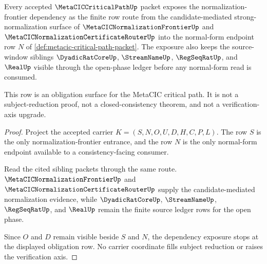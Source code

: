 \begin{theorem}
\label{thm:metacic-critical-path-normalization-frontier-dependency-exposure}
Every accepted $\MetaCICCriticalPathUp$ packet exposes the normalization-frontier dependency as the finite row route from the candidate-mediated strong-normalization surface of $\MetaCICNormalizationFrontierUp$ and $\MetaCICNormalizationCertificateRouterUp$ into the normal-form endpoint row $N$ of \autoref{def:metacic-critical-path-packet}. The exposure also keeps the source-window siblings $\DyadicRatCoreUp$, $\StreamNameUp$, $\RegSeqRatUp$, and $\RealUp$ visible through the open-phase ledger before any normal-form read is consumed.

This row is an obligation surface for the MetaCIC critical path. It is not a subject-reduction proof, not a closed-consistency theorem, and not a verification-axis upgrade.
\end{theorem}
\begin{proof}
Project the accepted carrier $K=(S,N,O,U,D,H,C,P,L)$. The row $S$ is the only normalization-frontier entrance, and the row $N$ is the only normal-form endpoint available to a consistency-facing consumer.

Read the cited sibling packets through the same route. $\MetaCICNormalizationFrontierUp$ and $\MetaCICNormalizationCertificateRouterUp$ supply the candidate-mediated normalization evidence, while $\DyadicRatCoreUp$, $\StreamNameUp$, $\RegSeqRatUp$, and $\RealUp$ remain the finite source ledger rows for the open phase.

Since $O$ and $D$ remain visible beside $S$ and $N$, the dependency exposure stops at the displayed obligation row. No carrier coordinate fills subject reduction or raises the verification axis.
\end{proof}

